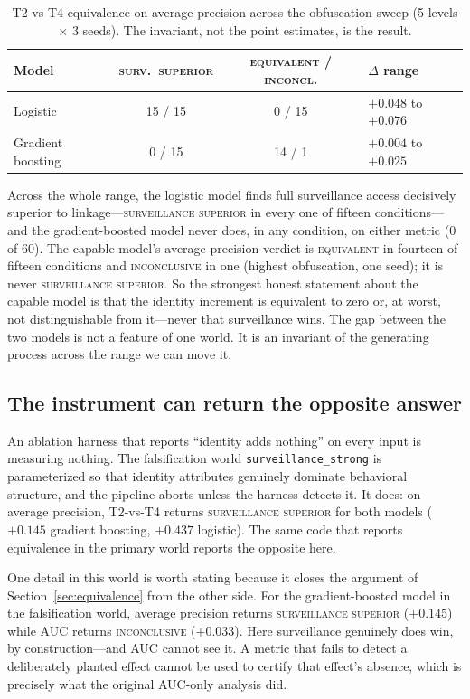 \documentclass[11pt]{article}
\begin{document}
\begin{table}[htbp]
\centering
\caption{T2-vs-T4 equivalence on average precision across the obfuscation sweep (5 levels $\times$ 3
seeds). The invariant, not the point estimates, is the result.}
\label{tab:robustness}
\begin{tabular}{lccl}
\toprule
Model & \textsc{surv.\ superior} & \textsc{equivalent} / \textsc{inconcl.} & $\Delta$ range \\
\midrule
Logistic          & 15 / 15 & 0 / 15 & $+0.048$ to $+0.076$ \\
Gradient boosting & 0 / 15  & 14 / 1 & $+0.004$ to $+0.025$ \\
\bottomrule
\end{tabular}
\end{table}

Across the whole range, the logistic model finds full surveillance access decisively superior to
linkage---\textsc{surveillance superior} in every one of fifteen conditions---and the gradient-boosted
model never does, in any condition, on either metric (0 of 60). The capable model's average-precision
verdict is \textsc{equivalent} in fourteen of fifteen conditions and \textsc{inconclusive} in one
(highest obfuscation, one seed); it is never \textsc{surveillance superior}. So the strongest honest
statement about the capable model is that the identity increment is equivalent to zero or, at worst,
not distinguishable from it---never that surveillance wins. The gap between the two models is not a
feature of one world. It is an invariant of the generating process across the range we can move it.

\subsection{The instrument can return the opposite answer}
\label{sec:falsify}

An ablation harness that reports ``identity adds nothing'' on every input is measuring nothing. The
falsification world \texttt{surveillance\_strong} is parameterized so that identity attributes
genuinely dominate behavioral structure, and the pipeline aborts unless the harness detects it. It
does: on average precision, T2-vs-T4 returns \textsc{surveillance superior} for both models
($+0.145$ gradient boosting, $+0.437$ logistic). The same code that reports equivalence in the primary
world reports the opposite here.

One detail in this world is worth stating because it closes the argument of
Section~\ref{sec:equivalence} from the other side. For the gradient-boosted model in the falsification
world, average precision returns \textsc{surveillance superior} ($+0.145$) while AUC returns
\textsc{inconclusive} ($+0.033$). Here surveillance genuinely does win, by construction---and AUC
cannot see it. A metric that fails to detect a deliberately planted effect cannot be used to certify
that effect's absence, which is precisely what the original AUC-only analysis did.
\end{document}
